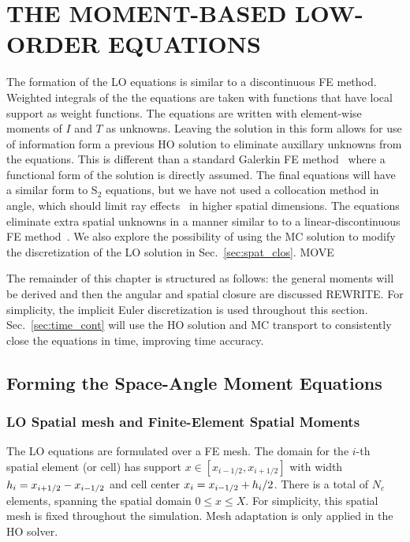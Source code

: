 
\chapter{\uppercase{The Moment-Based Low-Order Equations}}

The formation of the LO equations is similar to a discontinuous FE method.  Weighted
integrals of the the equations are taken with functions that have local support as weight
functions.  The equations are written with element-wise moments of $I$ and $T$ as
unknowns.  Leaving the solution in this form allows for use of information form a
previous HO solution to eliminate auxillary unknowns from the equations. This is different than a standard Galerkin FE
method~\cite{fe_book} where a
functional form of the solution is directly assumed. The final equations will have a
similar form to S$_2$ equations, but we have not used a collocation method in angle,
which should limit ray effects~\cite{ray_effects} in higher spatial dimensions.
The equations eliminate extra spatial unknowns in a manner similar to to a linear-discontinuous FE
method~\cite{morel_ldtrt}.  We also explore the
possibility of using the MC solution to modify the discretization of the LO solution in
Sec.~\ref{sec:spat_clos}.   MOVE


The remainder of this chapter is structured as follows: the general moments will be
derived and then the angular and spatial closure are discussed REWRITE.  For
simplicity, the implicit Euler discretization is used throughout this section.
Sec.~\ref{sec:time_cont} will use the HO solution and MC transport to consistently
close the equations in time, improving time accuracy.

\section{Forming the Space-Angle Moment Equations}

\subsection{LO Spatial mesh and Finite-Element Spatial Moments}

The LO equations are formulated over a FE mesh.  The domain for the $i$-th spatial
element (or cell) has support $x\in[x_{i-1/2},x_{i+1/2}]$ with width $h_i=x_{i+1/2} -
x_{{i-1/2}}$ and cell center 
$x_i = x_{{i-1/2}} + h_i/2$.  There is a total of $N_c$ elements, spanning the
spatial domain $0\leq x\leq X$.  For simplicity, this spatial mesh is fixed throughout the
simulation.  Mesh adaptation is only applied in the HO solver.

